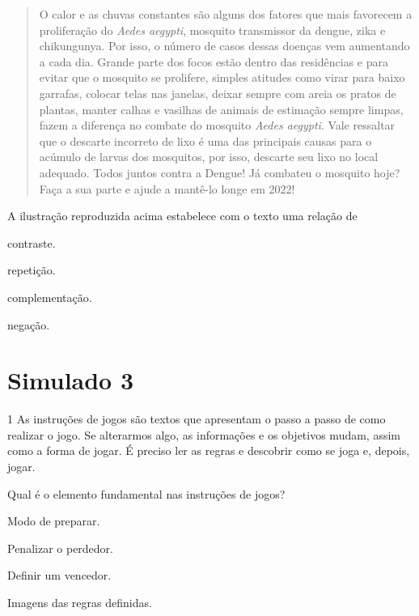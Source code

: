 \begin{quote}
O calor e as chuvas constantes são alguns dos fatores que mais
favorecem a proliferação do \textit{Aedes aegypti}, mosquito transmissor da
dengue, zika e chikungunya. Por isso, o número de casos dessas doenças
vem aumentando a cada dia. Grande parte dos focos estão dentro das
residências e para evitar que o mosquito se prolifere, simples atitudes
como virar para baixo garrafas, colocar telas nas janelas, deixar sempre
com areia os pratos de plantas, manter calhas e vasilhas de animais de
estimação sempre limpas, fazem a diferença no combate do mosquito 
\textit{Aedes aegypti}. Vale ressaltar que o descarte incorreto de 
lixo é uma das principais causas para o acúmulo de larvas dos mosquitos,
por isso, descarte seu lixo no local adequado. Todos juntos contra a
Dengue! Já combateu o mosquito hoje? Faça a sua parte e ajude a mantê-lo
longe em 2022!
\end{quote}


A ilustração reproduzida acima estabelece com o texto uma relação de

\begin{escolha}

  \item contraste.

  \item repetição.

  \item complementação.

  \item negação.

\end{escolha}

\chapter{Simulado 3}

\num{1} As instruções de jogos são textos que apresentam o passo a passo
de como realizar o jogo. Se alterarmos algo, as informações e os objetivos
mudam, assim como a forma de jogar. É preciso ler as regras e descobrir
como se joga e, depois, jogar.

Qual é o elemento fundamental nas instruções de jogos?

\begin{escolha}
\item Modo de preparar.

\item Penalizar o perdedor.

\item Definir um vencedor.

\item Imagens das regras definidas.
\end{escolha}



